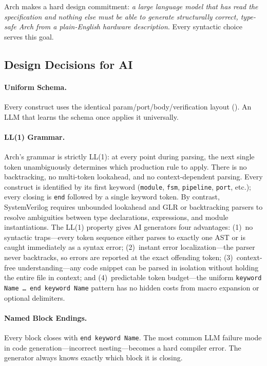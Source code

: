 \documentclass[11pt,twocolumn]{article}
\begin{document}
Arch makes a hard design commitment: \emph{a large language model that has read the specification and nothing else must be able to generate structurally correct, type-safe Arch from a plain-English hardware description}. Every syntactic choice serves this goal.

\subsection{Design Decisions for AI}

\paragraph{Uniform Schema.} Every construct uses the identical param/port/body/verification layout (). An LLM that learns the schema once applies it universally.

\paragraph{LL(1) Grammar.} Arch's grammar is strictly LL(1): at every point during parsing, the next single token unambiguously determines which production rule to apply. There is no backtracking, no multi-token lookahead, and no context-dependent parsing. Every construct is identified by its first keyword (\texttt{module}, \texttt{fsm}, \texttt{pipeline}, \texttt{port}, etc.); every closing is \texttt{end} followed by a single keyword token. By contrast, SystemVerilog requires unbounded lookahead and GLR or backtracking parsers to resolve ambiguities between type declarations, expressions, and module instantiations. The LL(1) property gives AI generators four advantages: (1)~no syntactic traps---every token sequence either parses to exactly one AST or is caught immediately as a syntax error; (2)~instant error localization---the parser never backtracks, so errors are reported at the exact offending token; (3)~context-free understanding---any code snippet can be parsed in isolation without holding the entire file in context; and (4)~predictable token budget---the uniform \texttt{keyword Name \ldots\ end keyword Name} pattern has no hidden costs from macro expansion or optional delimiters.

\paragraph{Named Block Endings.} Every block closes with \texttt{end keyword Name}. The most common LLM failure mode in code generation---incorrect nesting---becomes a hard compiler error. The generator always knows exactly which block it is closing.
\end{document}
